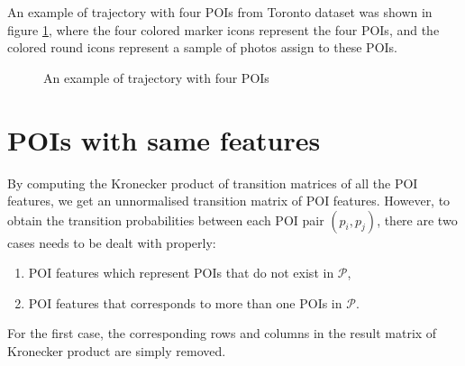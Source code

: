 An example of trajectory with four POIs from Toronto dataset was shown in figure \ref{fig:traj},
where the four colored marker icons represent the four POIs,
and the colored round icons represent a sample of photos assign to these POIs.


\begin{figure}
\centering
{}
\caption{An example of trajectory with four POIs}
\label{fig:traj}
\end{figure}



\section{POIs with same features}


By computing the Kronecker product of transition matrices of all the POI features,
we get an unnormalised transition matrix of POI features.
However, to obtain the transition probabilities between each POI pair $(p_i, p_j)$,
there are two cases needs to be dealt with properly:
\begin{enumerate}
\item POI features which represent POIs that do not exist in $\mathcal{P}$,
\item POI features that corresponds to more than one POIs in $\mathcal{P}$.
\end{enumerate}

For the first case,
the corresponding rows and columns in the result matrix of Kronecker product are simply removed.


